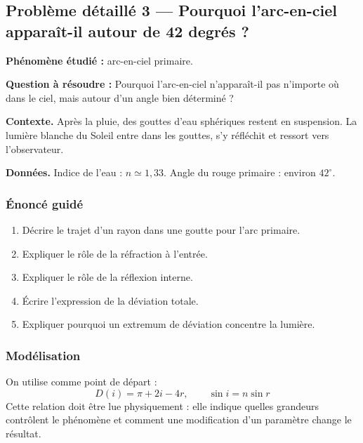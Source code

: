 \documentclass[11pt,a4paper]{article}
\begin{document}
\subsection{Problème détaillé 3 — Pourquoi l'arc-en-ciel apparaît-il autour de 42 degrés ?}

\begin{exercicebox}
\textbf{Phénomène étudié :} arc-en-ciel primaire.

\medskip
\textbf{Question à résoudre :} Pourquoi l'arc-en-ciel n'apparaît-il pas n'importe où dans le ciel, mais autour d'un angle bien déterminé ?

\medskip
\textbf{Contexte.} Après la pluie, des gouttes d'eau sphériques restent en suspension. La lumière blanche du Soleil entre dans les gouttes, s'y réfléchit et ressort vers l'observateur.

\medskip
\textbf{Données.} Indice de l'eau : \(n\simeq1{,}33\). Angle du rouge primaire : environ \(42^\circ\).
\end{exercicebox}

\subsubsection*{Énoncé guidé}

\begin{enumerate}
  \item Décrire le trajet d'un rayon dans une goutte pour l'arc primaire.
  \item Expliquer le rôle de la réfraction à l'entrée.
  \item Expliquer le rôle de la réflexion interne.
  \item Écrire l'expression de la déviation totale.
  \item Expliquer pourquoi un extremum de déviation concentre la lumière.
\end{enumerate}

\subsubsection*{Modélisation}

\begin{theorembox}
On utilise comme point de départ :
\[
D(i)=\pi+2i-4r,\qquad \sin i=n\sin r
\]
Cette relation doit être lue physiquement : elle indique quelles grandeurs contrôlent le phénomène et comment une modification d'un paramètre change le résultat.
\end{theorembox}
\end{document}
